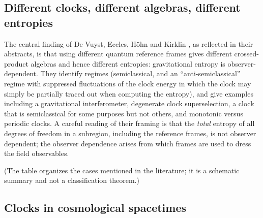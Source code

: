 \subsection{Different clocks, different algebras, different entropies}

The central finding of De Vuyst, Eccles, H\"ohn and Kirklin \cite{DEHK2024a,DEHK2024b}, as reflected in their abstracts, is that using different quantum reference frames gives different crossed-product algebras and hence different entropies: gravitational entropy is observer-dependent. They identify regimes (semiclassical, and an ``anti-semiclassical'' regime with suppressed fluctuations of the clock energy in which the clock may simply be partially traced out when computing the entropy), and give examples including a gravitational interferometer, degenerate clock superselection, a clock that is semiclassical for some purposes but not others, and monotonic versus periodic clocks. A careful reading of their framing is that the \emph{total} entropy of all degrees of freedom in a subregion, including the reference frames, is not observer dependent; the observer dependence arises from which frames are used to dress the field observables.

\begin{center}
\renewcommand{\arraystretch}{1.3}
\end{center}
(The table organizes the cases mentioned in the literature; it is a schematic summary and not a classification theorem.)

\subsection{Clocks in cosmological spacetimes}

